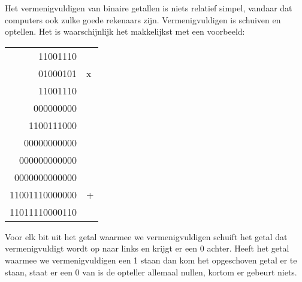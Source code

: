 Het vermenigvuldigen van binaire getallen is niets relatief simpel, vandaar dat computers ook zulke goede rekenaars zijn. Vermenigvuldigen is schuiven en optellen. Het is waarschijnlijk het makkelijkst met een voorbeeld:

\begin{center}
\begin{tabular}{ r l }
      11001110 & \\
      01000101 & x\\
\hline
      11001110 & \\
     000000000 & \\
    1100111000 & \\
   00000000000 & \\
  000000000000 & \\
 0000000000000 & \\
11001110000000 & + \\
\hline
11011110000110
\end{tabular}
\end{center}

Voor elk bit uit het getal waarmee we vermenigvuldigen schuift het getal dat vermenigvuldigt wordt op naar links en krijgt er een 0 achter. Heeft het getal waarmee we vermenigvuldigen een 1 staan dan kom het opgeschoven getal er te staan, staat er een 0 van is de opteller allemaal nullen, kortom er gebeurt niets.
